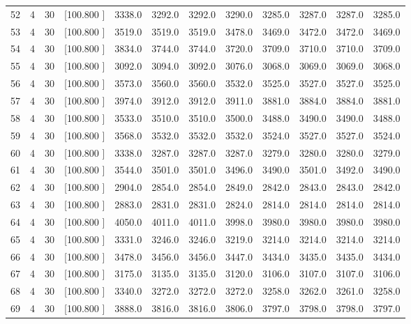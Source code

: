 \documentclass[12pt,a4paper]{article}
\begin{document}
\begin{center}
{\begin{tabular}{r r r r r r r r r r r r}
  52&  4& 30&[100.800   ]&  3338.0&  3292.0&  3292.0&  3290.0&  3285.0&  3287.0&  3287.0&  3285.0\\[-0.02in]
  53&  4& 30&[100.800   ]&  3519.0&  3519.0&  3519.0&  3478.0&  3469.0&  3472.0&  3472.0&  3469.0\\[-0.02in]
  54&  4& 30&[100.800   ]&  3834.0&  3744.0&  3744.0&  3720.0&  3709.0&  3710.0&  3710.0&  3709.0\\[-0.02in]
  55&  4& 30&[100.800   ]&  3092.0&  3094.0&  3092.0&  3076.0&  3068.0&  3069.0&  3069.0&  3068.0\\[-0.02in]
  56&  4& 30&[100.800   ]&  3573.0&  3560.0&  3560.0&  3532.0&  3525.0&  3527.0&  3527.0&  3525.0\\[-0.02in]
  57&  4& 30&[100.800   ]&  3974.0&  3912.0&  3912.0&  3911.0&  3881.0&  3884.0&  3884.0&  3881.0\\[-0.02in]
  58&  4& 30&[100.800   ]&  3533.0&  3510.0&  3510.0&  3500.0&  3488.0&  3490.0&  3490.0&  3488.0\\[-0.02in]
  59&  4& 30&[100.800   ]&  3568.0&  3532.0&  3532.0&  3532.0&  3524.0&  3527.0&  3527.0&  3524.0\\[-0.02in]
  60&  4& 30&[100.800   ]&  3338.0&  3287.0&  3287.0&  3287.0&  3279.0&  3280.0&  3280.0&  3279.0\\[-0.02in]
  61&  4& 30&[100.800   ]&  3544.0&  3501.0&  3501.0&  3496.0&  3490.0&  3501.0&  3492.0&  3490.0\\[-0.02in]
  62&  4& 30&[100.800   ]&  2904.0&  2854.0&  2854.0&  2849.0&  2842.0&  2843.0&  2843.0&  2842.0\\[-0.02in]
  63&  4& 30&[100.800   ]&  2883.0&  2831.0&  2831.0&  2824.0&  2814.0&  2814.0&  2814.0&  2814.0\\[-0.02in]
  64&  4& 30&[100.800   ]&  4050.0&  4011.0&  4011.0&  3998.0&  3980.0&  3980.0&  3980.0&  3980.0\\[-0.02in]
  65&  4& 30&[100.800   ]&  3331.0&  3246.0&  3246.0&  3219.0&  3214.0&  3214.0&  3214.0&  3214.0\\[-0.02in]
  66&  4& 30&[100.800   ]&  3478.0&  3456.0&  3456.0&  3447.0&  3434.0&  3435.0&  3435.0&  3434.0\\[-0.02in]
  67&  4& 30&[100.800   ]&  3175.0&  3135.0&  3135.0&  3120.0&  3106.0&  3107.0&  3107.0&  3106.0\\[-0.02in]
  68&  4& 30&[100.800   ]&  3340.0&  3272.0&  3272.0&  3272.0&  3258.0&  3262.0&  3261.0&  3258.0\\[-0.02in]
  69&  4& 30&[100.800   ]&  3888.0&  3816.0&  3816.0&  3806.0&  3797.0&  3798.0&  3798.0&  3797.0\\[-0.02in]

\end{tabular}}
\end{center}
\end{document}
